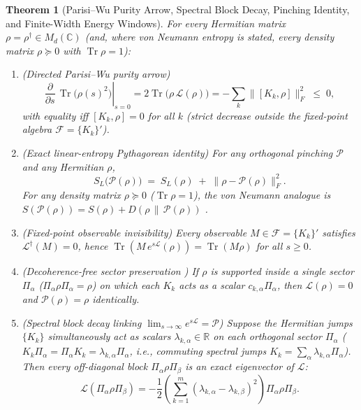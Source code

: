 \documentclass[11pt,a4paper]{article}
\newtheorem{theorem}{Theorem}
\theoremstyle{definition}
\theoremstyle{remark}
\newcommand{\Tr}{\operatorname{Tr}}
\newcommand{\cL}{\mathcal{L}}
\newcommand{\cP}{\mathcal{P}}
\newcommand{\cF}{\mathcal{F}}
\newcommand{\bbC}{\mathbb{C}}
\newcommand{\bbR}{\mathbb{R}}
\newcommand{\1}{\mathbf{1}}
\newcommand{\normF}[1]{\|#1\|_F}
\begin{document}
\begin{theorem}[Parisi--Wu Purity Arrow, Spectral Block Decay, Pinching Identity, and Finite-Width Energy Windows]\label{thm:double}
For every Hermitian matrix $\rho = \rho^\dagger \in M_d(\bbC)$ (and, where von Neumann entropy is stated, every density matrix $\rho \succeq 0$ with $\Tr\rho = 1$):
\begin{enumerate}
  \item[(a)] \emph{(Directed Parisi--Wu purity arrow)}
  \begin{equation}\label{eq:pw-arrow}
    \left.\frac{\partial}{\partial s}\,\Tr\bigl(\rho(s)^2\bigr)\right|_{s=0} = 2\Tr\bigl(\rho\,\cL(\rho)\bigr) = -\sum_k \normF{[K_k, \rho]}^2 \;\le\; 0,
  \end{equation}
  with equality iff $[K_k, \rho] = 0$ for all $k$ (strict decrease outside the fixed-point algebra $\cF = \{K_k\}'$).
  \item[(b)] \emph{(Exact linear-entropy Pythagorean identity)} For any orthogonal pinching $\cP$ and any Hermitian $\rho$,
  \begin{equation}\label{eq:pythagorean}
    S_L\bigl(\cP(\rho)\bigr) \;=\; S_L(\rho) \;+\; \normF{\rho - \cP(\rho)}^2.
  \end{equation}
  For any density matrix $\rho \succeq 0$ ($\Tr\rho=1$), the von Neumann analogue is $S(\cP(\rho)) = S(\rho) + D(\rho \,\|\, \cP(\rho))$ \cite{Baumgratz2014}.
  \item[(c)] \emph{(Fixed-point observable invisibility)} Every observable $M \in \cF = \{K_k\}'$ satisfies $\cL^\dagger(M) = 0$, hence $\Tr(M\,e^{s\cL}(\rho)) = \Tr(M\rho)$ for all $s \ge 0$.
  \item[(d)] \emph{(Decoherence-free sector preservation \cite{Lidar1998})} If $\rho$ is supported inside a single sector $\Pi_\alpha$ ($\Pi_\alpha\rho\Pi_\alpha = \rho$) on which each $K_k$ acts as a scalar $c_{k,\alpha}\Pi_\alpha$, then $\cL(\rho) = 0$ and $\cP(\rho) = \rho$ identically.
  \item[(e)] \emph{(Spectral block decay linking $\lim_{s\to\infty} e^{s\cL} = \cP$)} Suppose the Hermitian jumps $\{K_k\}$ simultaneously act as scalars $\lambda_{k,\alpha} \in \bbR$ on each orthogonal sector $\Pi_\alpha$ ($K_k\Pi_\alpha = \Pi_\alpha K_k = \lambda_{k,\alpha}\Pi_\alpha$, i.e., commuting spectral jumps $K_k = \sum_\alpha \lambda_{k,\alpha}\Pi_\alpha$). Then every off-diagonal block $\Pi_\alpha\rho\Pi_\beta$ is an exact eigenvector of $\cL$:
  \begin{equation}\label{eq:block-eigen}
    \cL(\Pi_\alpha\rho\Pi_\beta) = -\frac{1}{2}\left(\sum_{k=1}^m (\lambda_{k,\alpha} - \lambda_{k,\beta})^2\right)\Pi_\alpha\rho\Pi_\beta.

\end{equation}
\end{enumerate}
\end{theorem}
\end{document}
